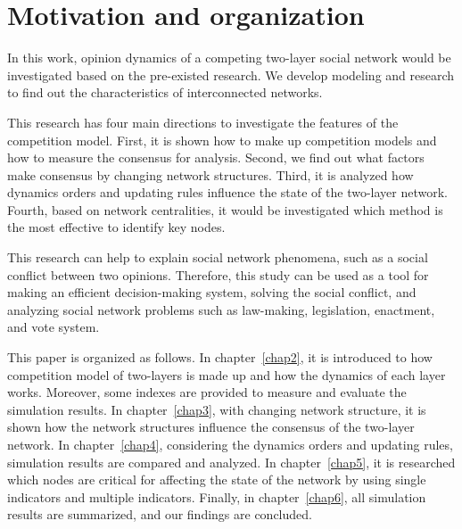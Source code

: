 \section{Motivation and organization}

In this work, opinion dynamics of a competing two-layer social network would be investigated based on the pre-existed research\parencite{alvarez2016, gomez2015, diep2017, rocca2014}. We develop modeling and research to find out the characteristics of interconnected networks. 

This research has four main directions to investigate the features of the competition model. First, it is shown how to make up competition models and how to measure the consensus for analysis. Second, we find out what factors make consensus by changing network structures. Third, it is analyzed how dynamics orders and updating rules influence the state of the two-layer network. Fourth, based on network centralities, it would be investigated which method is the most effective to identify key nodes.

This research can help to explain social network phenomena, such as a social conflict between two opinions. Therefore, this study can be used as a tool for making an efficient decision-making system, solving the social conflict, and analyzing social network problems such as law-making, legislation, enactment, and vote system.

This paper is organized as follows. In chapter~\ref{chap2}, it is introduced to how competition model of two-layers is made up and how the dynamics of each layer works. Moreover, some indexes are provided to measure and evaluate the simulation results. In chapter~\ref{chap3}, with changing network structure, it is shown how the network structures influence the consensus of the two-layer network. In chapter~\ref{chap4}, considering the dynamics orders and updating rules, simulation results are compared and analyzed. In chapter~\ref{chap5}, it is researched which nodes are critical for affecting the state of the network by using single indicators and multiple indicators. Finally, in chapter~\ref{chap6}, all simulation results are summarized, and our findings are concluded. \\


